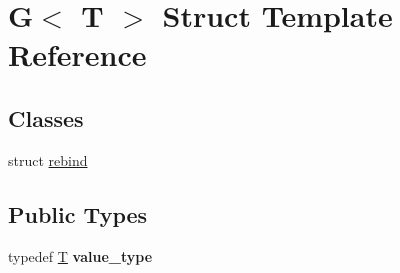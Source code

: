 \hypertarget{class_g}{}\section{G$<$ T $>$ Struct Template Reference}
\label{class_g}
\subsection*{Classes}
\begin{DoxyCompactItemize}
\item 
struct \mbox{\hyperlink{struct_g_1_1rebind}{rebind}}
\end{DoxyCompactItemize}
\subsection*{Public Types}
\begin{DoxyCompactItemize}
\item 
\mbox{\label{class_g_a12a2219e3e45510a242eaa47116175e9}} 
typedef \mbox{\hyperlink{struct_t}{T}} {\bfseries value\+\_\+type}
\end{DoxyCompactItemize}
